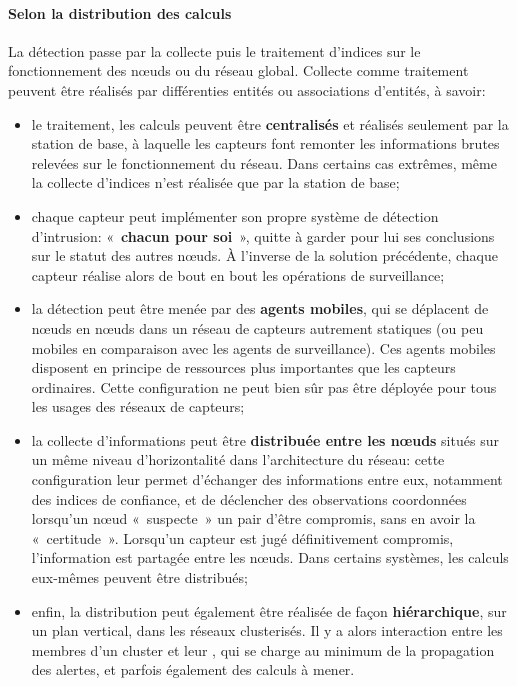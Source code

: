         \paragraph{Selon la distribution des calculs}
La détection passe par la collecte puis le traitement d'indices sur le fonctionnement des nœuds ou du réseau global.
Collecte comme traitement peuvent être réalisés par différenties entités ou associations d'entités, à savoir:
\begin{itemize}
    \item le traitement, les calculs peuvent être \textbf{centralisés} et réalisés seulement par la station de base, à laquelle les capteurs font remonter les informations brutes relevées sur le fonctionnement du réseau. Dans certains cas extrêmes, même la collecte d'indices n'est réalisée que par la station de base;
    \item chaque capteur peut implémenter son propre système de détection d'intrusion: « \textbf{chacun pour soi} », quitte à garder pour lui ses conclusions sur le statut des autres nœuds. À l'inverse de la solution précédente, chaque capteur réalise alors de bout en bout les opérations de surveillance;
    \item la détection peut être menée par des \textbf{agents mobiles}, qui se déplacent de nœuds en nœuds dans un réseau de capteurs autrement statiques (ou peu mobiles en comparaison avec les agents de surveillance). Ces agents mobiles disposent en principe de ressources plus importantes que les capteurs ordinaires. Cette configuration ne peut bien sûr pas être déployée pour tous les usages des réseaux de capteurs;
    \item la collecte d'informations peut être \textbf{distribuée entre les nœuds} situés sur un même niveau d'horizontalité dans l'architecture du réseau: cette configuration leur permet d'échanger des informations entre eux, notamment des indices de confiance, et de déclencher des observations coordonnées lorsqu'un nœud « suspecte » un pair d'être compromis, sans en avoir la « certitude ». Lorsqu'un capteur est jugé définitivement compromis, l'information est partagée entre les nœuds. Dans certains systèmes, les calculs eux-mêmes peuvent être distribués;
    \item enfin, la distribution peut également être réalisée de façon \textbf{hiérarchique}, sur un plan vertical, dans les réseaux clusterisés. Il y a alors interaction entre les membres d'un cluster et leur \ch, qui se charge au minimum de la propagation des alertes, et parfois également des calculs à mener.
\end{itemize}

